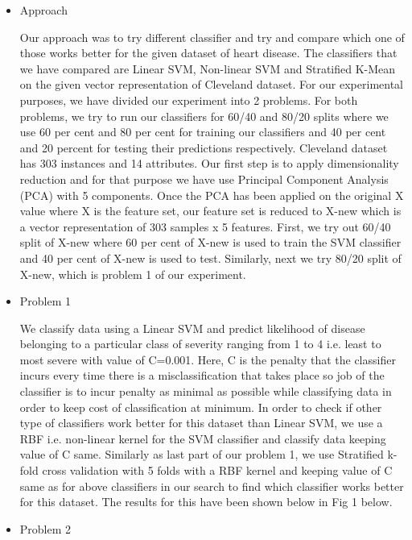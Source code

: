 \begin{itemize}
\item{Approach}

\tab Our approach was to try different classifier and try and compare which one of those works better for the given dataset of heart disease. The classifiers that we have compared are Linear SVM, Non-linear SVM and Stratified K-Mean on the given vector representation of Cleveland dataset. For our experimental purposes, we have divided our experiment into 2 problems. For both problems, we try to run our classifiers for 60/40 and 80/20 splits where we use 60 per cent and 80 per cent for training our classifiers and 40 per cent  and 20 percent for testing their predictions respectively. Cleveland dataset  has 303 instances and 14 attributes. Our first step is to apply dimensionality reduction and for that purpose we have use Principal Component Analysis (PCA) with 5 components. Once the PCA has been applied on the original X value where X is the feature set, our feature set is reduced to X-new which is a vector representation of 303 samples x 5 features.  First, we try out 60/40 split of X-new where 60 per cent of X-new is used to train the SVM classifier and 40 per cent of X-new is used to test. Similarly, next we try 80/20 split of X-new, which is problem 1 of our experiment. \\

\item{Problem 1}

\tab We classify data using a Linear SVM and predict likelihood of disease belonging to a particular class of severity ranging from 1 to 4 i.e. least to most severe with value of C=0.001. Here, C is the penalty that the classifier incurs every time there is a misclassification that takes place so job of the classifier is to incur penalty as minimal as possible while classifying data in order to keep cost of classification at minimum. In order to check if other type of classifiers work better for this dataset than Linear SVM, we use a RBF i.e. non-linear kernel for the SVM classifier and classify data keeping value of C same. Similarly as last part of our problem 1, we use Stratified k-fold cross validation with 5 folds with a RBF kernel and keeping value of C same as for above classifiers in our search to find which classifier works better for this dataset. The results for this have been shown below in Fig 1 below. \\

\item{Problem 2}


\end{itemize}

